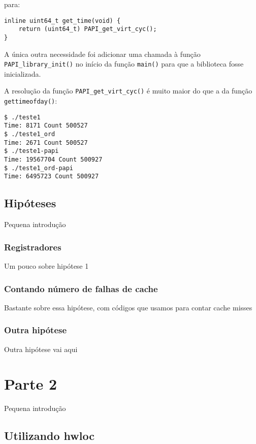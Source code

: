 \documentclass[a4paper,oneside,12pt]{article}
\begin{document}
para:

\begin{verbatim}
inline uint64_t get_time(void) { 
    return (uint64_t) PAPI_get_virt_cyc();
}  
\end{verbatim}

A única outra necessidade foi adicionar uma chamada à função {\tt PAPI\_library\_init()} no início da função {\tt main()} para que a biblioteca fosse inicializada.

A resolução da função {\tt PAPI\_get\_virt\_cyc()} é muito maior do que a da função {\tt gettimeofday()}:

\begin{verbatim}
$ ./teste1
Time: 8171 Count 500527
$ ./teste1_ord
Time: 2671 Count 500527
$ ./teste1-papi
Time: 19567704 Count 500927
$ ./teste1_ord-papi
Time: 6495723 Count 500927
\end{verbatim}

\subsection{Hipóteses}

Pequena introdução %

\subsubsection{Registradores}

Um pouco sobre hipótese 1 %

\subsubsection{Contando número de falhas de cache}

Bastante sobre essa hipótese, com códigos que usamos para contar cache misses %

\subsubsection{Outra hipótese}

Outra hipótese vai aqui %

\section{Parte 2}

Pequena introdução %

\subsection{Utilizando hwloc}
\end{document}
